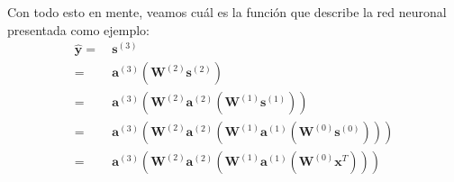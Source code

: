 \documentclass[../../main.tex]{subfiles}
\begin{document}
Con todo esto en mente, veamos cuál es la función que describe la red neuronal presentada
como ejemplo:
\begin{align*}
    \bm{\hat{y}} =\ & \bm{s}^{(3)} \\
        =\ & \bm{a}^{(3)} \left( \mathbf{W}^{(2)} \bm{s}^{(2)} \right) \\
        =\ & \bm{a}^{(3)} \left(
            \mathbf{W}^{(2)} \bm{a}^{(2)} \left(
                \mathbf{W}^{(1)} \bm{s}^{(1)}
            \right)
        \right) \\
        =\ & \bm{a}^{(3)} \left(
            \mathbf{W}^{(2)} \bm{a}^{(2)} \left(
                \mathbf{W}^{(1)} \bm{a}^{(1)} \left( \mathbf{W}^{(0)} \bm{s}^{(0)} \right)
            \right)
        \right) \\
        =\ & \bm{a}^{(3)} \left(
            \mathbf{W}^{(2)} \bm{a}^{(2)} \left(
                \mathbf{W}^{(1)} \bm{a}^{(1)} \left( \mathbf{W}^{(0)} \bm{x}^T \right)
            \right)
        \right)
\end{align*}
\end{document}
